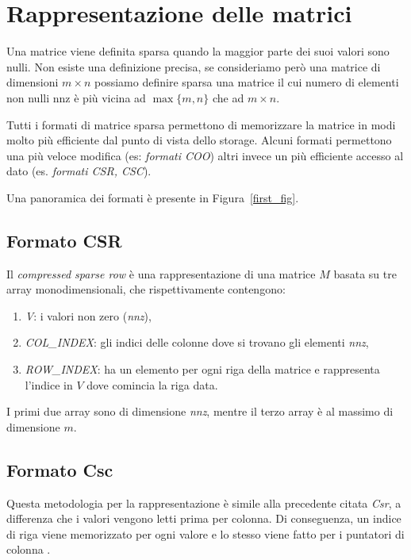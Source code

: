 \section{Rappresentazione delle matrici}\label{rappresentazione}

Una matrice viene definita sparsa quando la maggior parte dei suoi valori sono nulli. Non esiste una definizione precisa, se consideriamo però una matrice di dimensioni $m \times n$ possiamo definire sparsa una matrice il cui numero di elementi non nulli $\mathrm{nnz}$ è più vicina ad $\max\{m, n \}$ che ad $m \times n$. 

Tutti i formati di matrice sparsa permettono di memorizzare la matrice in modi molto più efficiente dal punto di vista dello storage. Alcuni formati permettono una più veloce modifica (es: \emph{formati COO}) altri invece un più efficiente accesso al dato (es. \emph{formati CSR, CSC}). 

Una panoramica dei formati è presente in Figura~\ref{first_fig}.

\subsection{Formato CSR}\label{csr}

Il \textit{compressed sparse row} è una rappresentazione di una matrice $M$ basata su tre array monodimensionali, che rispettivamente contengono:
\begin{enumerate}
\item \textit{V}: i valori non zero (\textit{nnz}),
\item \textit{COL\_INDEX}: gli indici delle colonne dove si trovano gli elementi \textit{nnz},
\item \textit{ROW\_INDEX}: ha un elemento per ogni riga della matrice e rappresenta l'indice in $ V $ dove comincia la riga data.
\end{enumerate}
I primi due array sono di dimensione \textit{nnz}, mentre il terzo array è al massimo di dimensione $ m $.

\subsection{Formato Csc}\label{csc}

Questa metodologia per la rappresentazione è simile alla precedente citata \textit{Csr}, a differenza che i valori vengono letti prima per colonna. Di conseguenza, un indice di riga viene memorizzato per ogni valore e lo stesso viene fatto per i puntatori di colonna .

